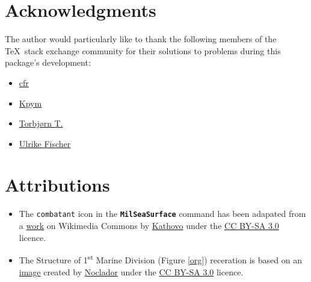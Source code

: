 \documentclass[a4paper, titlepage]{article}
\begin{document}
\clearpage

\begin{versionhistory}
\renewcommand \vhAuthorColWidth{6cm}
\end{versionhistory}

\clearpage

\section*{Acknowledgments}

The author would particularly like to thank the following members of the \TeX\  stack exchange community for their solutions to problems during this package\rq{}s development:

\begin{itemize}
\item \href{https://tex.stackexchange.com/users/39222}{cfr}
\item \href{https://tex.stackexchange.com/users/9335}{Kpym}
\item \href{https://tex.stackexchange.com/users/586}{Torbj\o rn T.}
\item \href{https://tex.stackexchange.com/users/2388}{Ulrike Fischer}
\end{itemize}

\section*{Attributions}

\begin{itemize}
\item The \texttt{combatant} icon in the \textbf{\texttt{MilSeaSurface}} command has been adapated from a \href{https://commons.wikimedia.org/wiki/File:Small_battle_symbol.svg}{work} on Wikimedia Commons by \href{https://commons.wikimedia.org/wiki/User:Kathovo}{Kathovo} under the \href{https://creativecommons.org/licenses/by-sa/3.0/}{CC BY-SA 3.0} licence.
\item The Structure of 1\textsuperscript{st} Marine Division (Figure \ref{org}) receration is based on an \href{https://commons.wikimedia.org/wiki/File:1st_US_Marine_Division.png}{image} created by \href{https://commons.wikimedia.org/wiki/User:Noclador}{Noclador} under the \href{https://creativecommons.org/licenses/by-sa/3.0/}{CC BY-SA 3.0} licence.
\end{itemize}
\end{document}

